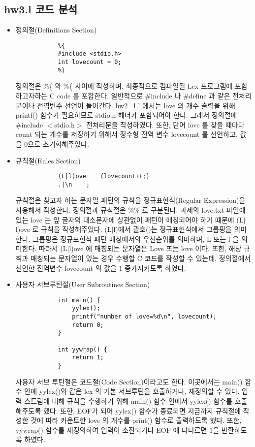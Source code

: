 \documentclass{article}
\begin{document}
\subsection{hw3.l 코드 분석}
\begin{itemize}
	\item 정의절(Definitions Section)	
		\begin{lstlisting}
			%{
			#include <stdio.h>
			int lovecount = 0;
			%}
		\end{lstlisting}
		정의절은 \%\{ 와 \%\{ 사이에 작성하며,
		최종적으로 컴파일될 Lex 프로그램에 포함하고자하는 C code 를 포함한다.
		일반적으로 \#include 나 \#define 과 같은 전처리문이나 전역변수 선언이 들어간다.
		hw2\_1.l 에서는 love 의 개수 출력을 위해 printf() 함수가 필요하므로 stdio.h
		헤더가 포함되어야 한다. 그래서 정의절에 \#include $<$stdio.h$>$ 전처리문을 작성하였다.
		또한, 단어 love 를 찾을 때마다 count 되는 개수를 저장하기 위해서 정수형 전역 변수
		lovecount 를 선언하고, 값을 0으로 초기화해주었다.
	\item 규칙절(Rules Section)	
		\begin{lstlisting}
			(L|l)ove	{lovecount++;}
			.|\n	;
		\end{lstlisting}
		규칙절은 찾고자 하는 문자열 패턴의 규칙을 정규표현식(Regular Expression)을
		사용해서 작성한다. 정의절과 규칙절은 \%\% 로 구분된다. 과제의 love.txt 파일에 있는
		love 는 앞 글자의 대소문자에 상관없이 패턴이 매칭되어야 하기 떄문에 (L$|$l)ove 로
		규칙을 작성해주었다. (L$|$l)에서 괄호()는 정규표현식에서 그룹핑을 의미한다. 그룹핑은
		정규표현식 패턴 매칭에서의 우선순위를 의미하며, L 또는 l 을 의미한다. 따라서 (L$|$l)ove
		에 매칭되는 문자열은 Love 또는 love 이다. 또한, 해당 규칙과 매칭되는 문자열이 있는 경우
		수행할 C 코드를 작성할 수 있는데, 정의절에서 선언한 전역변수 lovecount 의 값을 1
		증가시키도록 하였다.
	\item 사용자 서브루틴절(User Subroutines Section)	
		\begin{lstlisting}
			int main() {
				yylex();
				printf("number of love=%d\n", lovecount);
				return 0;
			}

			int yywrap() {
				return 1;
			}
		\end{lstlisting}
		사용자 서브 루틴절은 코드절(Code Section)이라고도 한다. 이곳에서는 main()
		함수 안에 yylex()와 같은 lex 의 기본 서브루틴을 호출하거나, 재정의할 수 있다.
		입력 스트림에 대해 규칙을 수행하기 위해 main() 함수 안에서 yylex() 함수를
		호출해주도록 했다. 또한, EOF가 되어 yylex() 함수가 종료되면 지금까지 규칙절에
		작성한 것에 따라 카운트한 love 의 개수를 print() 함수로 출력하도록 했다.
		또한, yywrap() 함수를 재정의하여 입력이 소진되거나 EOF 에 다다르면 1을
		반환하도록 하였다.
\end{itemize}
\end{document}
